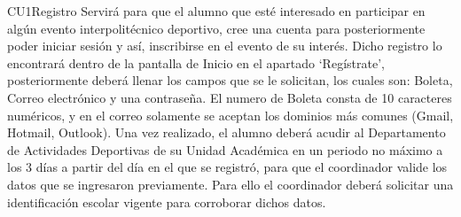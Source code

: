\begin{UseCase}{CU1}{Registro}{
		Servirá para que el alumno que esté interesado en participar en algún evento interpolitécnico deportivo, cree una cuenta para posteriormente poder iniciar sesión y así, inscribirse en el evento de su interés. 
		Dicho registro lo encontrará dentro de la pantalla de Inicio en el apartado ‘Regístrate’, posteriormente deberá llenar los campos que se le solicitan, los cuales son: Boleta, Correo electrónico y una contraseña.
		El numero de Boleta consta de 10 caracteres numéricos, y en el correo solamente se aceptan los dominios más comunes (Gmail, Hotmail, Outlook).
		Una vez realizado, el alumno deberá acudir al Departamento de Actividades Deportivas de su Unidad Académica en un periodo no máximo a los 3 días a partir del día en el que se registró, para que el coordinador valide los datos que se ingresaron previamente. Para ello el coordinador deberá solicitar una identificación escolar vigente para corroborar dichos datos. }
	
\end{UseCase}
